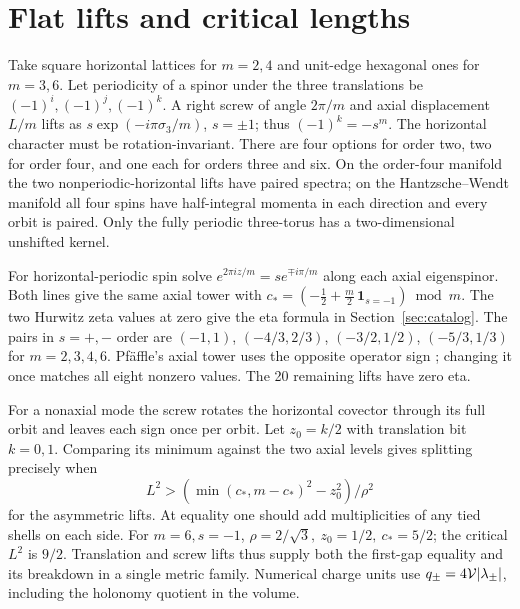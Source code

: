 \section{Flat lifts and critical lengths}\label{app:flat}
Take square horizontal lattices for \(m=2,4\) and unit-edge hexagonal ones for \(m=3,6\). Let periodicity of a spinor under the three translations be \((-1)^i,(-1)^j,(-1)^k\). A right screw of angle \(2\pi/m\) and axial displacement \(L/m\) lifts as \(s\exp(-i\pi\sigma_3/m)\), \(s=\pm1\); thus \((-1)^k=-s^m\). The horizontal character must be rotation-invariant. There are four options for order two, two for order four, and one each for orders three and six. On the order-four manifold the two nonperiodic-horizontal lifts have paired spectra; on the Hantzsche--Wendt manifold all four spins have half-integral momenta in each direction and every orbit is paired. Only the fully periodic three-torus has a two-dimensional unshifted kernel.

For horizontal-periodic spin solve \(e^{2\pi iz/m}=s e^{\mp i\pi/m}\) along each axial eigenspinor. Both lines give the same axial tower with
\(c_*=(-\tfrac12+\tfrac m2\,\mathbf1_{s=-1})\bmod m\). The two Hurwitz zeta values at zero give the eta formula in Section~\ref{sec:catalog}. The pairs in \(s=+,-\) order are \((-1,1)\), \((-4/3,2/3)\), \((-3/2,1/2)\), \((-5/3,1/3)\) for \(m=2,3,4,6\). Pf\"affle's axial tower uses the opposite operator sign \cite[Thms.~5.4, 5.6]{pfaffle}; changing it once matches all eight nonzero values. The 20 remaining lifts have zero eta.

For a nonaxial mode the screw rotates the horizontal covector through its full orbit and leaves each sign once per orbit. Let \(z_0=k/2\) with translation bit \(k=0,1\). Comparing its minimum against the two axial levels gives splitting precisely when
\[
 L^2>(\min(c_*,m-c_*)^2-z_0^2)/\rho^2
\]
for the asymmetric lifts. At equality one should add multiplicities of any tied shells on each side. For \(m=6,s=-1\), \(\rho=2/\sqrt3,\ z_0=1/2,\ c_*=5/2\); the critical \(L^2\) is \(9/2\). Translation and screw lifts thus supply both the first-gap equality and its breakdown in a single metric family. Numerical charge units use \(q_\pm=4\mathcal V|\lambda_\pm|\), including the holonomy quotient in the volume.
